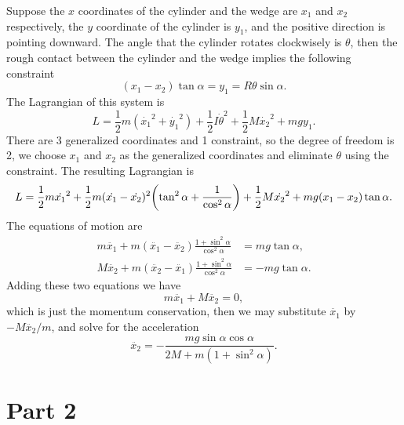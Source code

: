 \documentclass[10pt]{article}
\begin{document}
Suppose the $x$ coordinates of the cylinder and the wedge are $x_1$ and $x_2$ respectively, the $y$ coordinate of the cylinder is $y_1$, and the positive direction is pointing downward. The angle that the cylinder rotates clockwisely is $\theta$, then the rough contact between the cylinder and the wedge implies the following constraint 
\begin{equation}
	(x_1 - x_2) \tan{\alpha} = y_1 = R\theta \sin{\alpha}.
\end{equation}
The Lagrangian of this system is 
\begin{equation}
	L = \frac{1}{2}m(\dot{x_1}^2 + \dot{y_1}^2) + \frac{1}{2} I \dot{\theta}^2 + \frac{1}{2}M \dot{x_2}^2 + mg y_1.
\end{equation}
There are 3 generalized coordinates and 1 constraint, so the degree of freedom is 2, we choose $x_1$ and $x_2$ as the generalized coordinates and eliminate $\theta$ using the constraint. The resulting Lagrangian is 
\begin{equation}
	L = \frac{1}{2}m \dot{x_1}^2 + \frac{1}{2}m (\dot{x_1} - \dot{x_2})^2 \qty(\tan^2{\alpha} + \frac{1}{\cos^2{\alpha}}) + \frac{1}{2}M \dot{x_2}^2 + mg (x_1 - x_2) \tan{\alpha}.
\end{equation}
The equations of motion are 
\begin{align}
	m \ddot{x_1} + m (\ddot{x_1} - \ddot{x_2}) \frac{1+ \sin^2{\alpha}}{\cos^2{\alpha}} &= mg \tan{\alpha}, \\
	M \ddot{x_2} + m (\ddot{x_2} - \ddot{x_1}) \frac{1+ \sin^2{\alpha}}{\cos^2{\alpha}} &= -mg \tan{\alpha}.
\end{align}
Adding these two equations we have 
\begin{equation}
	m \ddot{x_1} + M\ddot{x_2} = 0,
\end{equation}
which is just the momentum conservation, then we may substitute $\ddot{x_1}$ by $-M \ddot{x_2} / m$, and solve for the acceleration 
\begin{equation}
	\ddot{x_2} = - \frac{mg \sin{\alpha} \cos{\alpha}}{2M + m(1 + \sin^2{\alpha})}.
\end{equation}

\section{Part 2}
\end{document}
